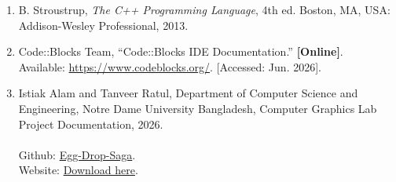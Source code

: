 \documentclass[12pt,a4paper]{report}
\begin{document}
\begin{enumerate}
\item B. Stroustrup, \textit{The C++ Programming Language}, 4th ed. Boston, MA, USA: Addison-Wesley Professional, 2013.

\item Code::Blocks Team, ``Code::Blocks IDE Documentation.'' \textbf{[Online]}.\\ Available: \href{https://www.codeblocks.org/}{https://www.codeblocks.org/}. [Accessed: Jun. 2026].

\item Istiak Alam and Tanveer Ratul, Department of Computer Science and Engineering, Notre Dame University Bangladesh, Computer Graphics Lab Project Documentation, 2026.\\ \\ Github: \href{https://github.com/Istiaq-Alam/Egg-Drop-Saga.git}{Egg-Drop-Saga}. \\
Website: \href{https://egg-drop-saga.vercel.app/}{Download here}.

\end{enumerate}
\end{document}
